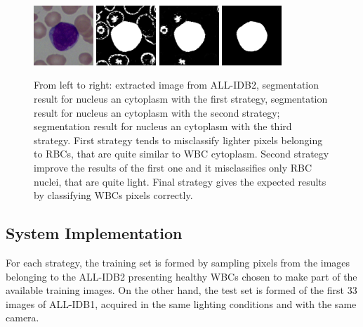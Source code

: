 \documentclass[final,a4paper,12pt,english]{UnicaPhdThesis3}
\begin{document}
{\begin{figure}[h]
	\centering
	\includegraphics[width=0.20\textwidth]{images/2015_1_caip/1-1}
	\includegraphics[width=0.20\textwidth]{images/2015_1_caip/1-3}
	\includegraphics[width=0.20\textwidth]{images/2015_1_caip/1-4}
	\includegraphics[width=0.20\textwidth]{images/2015_1_caip/1-2}
	\caption{\label{fig:exs1} From left to right: extracted image from ALL-IDB2, segmentation result for nucleus an cytoplasm with the first strategy, segmentation result for nucleus an cytoplasm with the second strategy; segmentation result for nucleus an cytoplasm with the third strategy. First strategy tends to misclassify lighter pixels belonging to RBCs, that are quite similar to WBC cytoplasm. Second strategy improve the results of the first one and it misclassifies only RBC nuclei, that are quite light. Final strategy gives the expected results by classifying WBCs pixels correctly. }
\end{figure}

\subsection{System Implementation}
For each strategy, the training set is formed by sampling pixels from the images belonging to the ALL-IDB2 presenting healthy WBCs chosen to make part of the available training images. On the other hand, the test set is formed of the first 33 images of ALL-IDB1, acquired in the same lighting conditions and with the same camera. 

}
\end{document}
